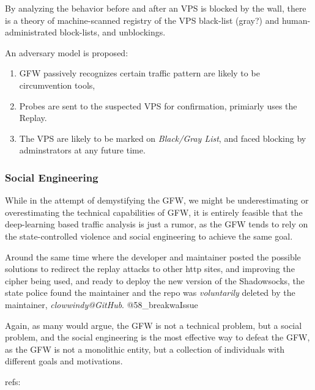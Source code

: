 By analyzing the behavior before and after an VPS is blocked by the
wall, there is a theory of machine-scanned registry of the VPS
black-list (gray?) and human-administrated block-lists, and unblockings.

An adversary model is proposed:

\begin{enumerate}
\def\labelenumi{\arabic{enumi}.}
\item
  GFW passively recognizes certain traffic pattern are likely to be
  circumvention tools,
\item
  Probes are sent to the suspected VPS for confirmation, primiarly uses
  the Replay.
\item
  The VPS are likely to be marked on \emph{Black/Gray List}, and faced
  blocking by adminstrators at any future time.
\end{enumerate}

\hypertarget{social-engineering}{%
\subsubsection{Social Engineering}\label{social-engineering}}

While in the attempt of demystifying the GFW, we might be
underestimating or overestimating the technical capabilities of GFW, it
is entirely feasible that the deep-learning based traffic analysis is
just a rumor, as the GFW tends to rely on the state-controlled violence
and social engineering to achieve the same goal.

Around the same time where the developer and maintainer posted the
possible solutions to redirect the replay attacks to other http sites,
and improving the cipher being used, and ready to deploy the new version
of the Shadowsocks, the state police found the maintainer and the repo
was \emph{voluntarily} deleted by the maintainer,
\emph{clowwindy@GitHub}. @58\_breakwaIssue

Again, as many would argue, the GFW is not a technical problem, but a
social problem, and the social engineering is the most effective way to
defeat the GFW, as the GFW is not a monolithic entity, but a collection
of individuals with different goals and motivations.

refs:


